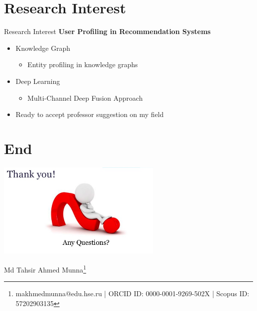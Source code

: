 \documentclass[smaller,aspectratio=169]{beamer}
\begin{document}
	\section{Research Interest}
	\begin{frame}{Research Interest}
	\textbf {User Profiling in Recommendation Systems}
	\begin{itemize}
	    \item Knowledge Graph
	    \begin{itemize}
	        \item Entity profiling in knowledge graphs
	    \end{itemize}
	    \item Deep Learning
	    \begin{itemize}
	        \item  Multi-Channel Deep Fusion Approach
	    \end{itemize}
	  \item Ready to accept professor suggestion on my field 
	\end{itemize}
	    
	\end{frame}
	\section{End}
	\begin{frame}
	    \begin{center}
	       \includegraphics[width=8cm]{img/questions.png}
	    \end{center}
	   \flushleft \small{Md Tahsir Ahmed Munna\footnote{ makhmedmunna@edu.hse.ru | ORCID ID: 0000-0001-9269-502X | Scopus ID: 57202903135}}
	\end{frame}
    
  
	
\end{document}
